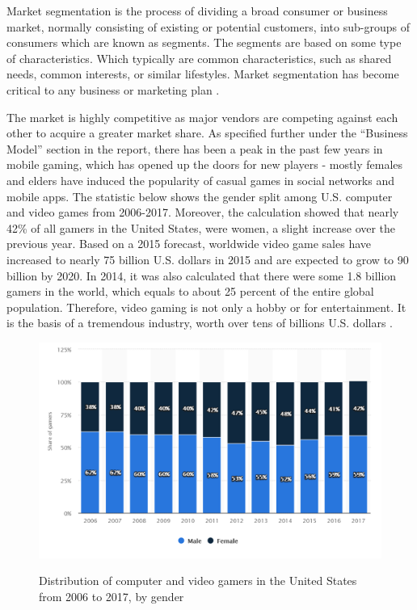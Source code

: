 \documentclass[12p]{article}
\begin{document}
Market segmentation is the process of dividing a broad consumer or business market, normally consisting of existing or potential customers, into sub-groups of consumers which are known as segments. The segments are based on some type of characteristics. Which typically are common characteristics, such as shared needs, common interests, or similar lifestyles. Market segmentation has become critical to any business or marketing plan \cite{MarketSegmentation}.

The market is highly competitive as major vendors are competing against each other to acquire a greater market share.  As specified further under the “Business Model” section in the report, there has been a peak in the past few years in mobile gaming, which has opened up the doors for new players - mostly females and elders have induced the popularity of casual games in social networks and mobile apps. The statistic below shows the gender split among U.S. computer and video games from 2006-2017. Moreover, the calculation showed that nearly 42\% of all gamers in the United States, were women, a slight increase over the previous year. Based on a 2015 forecast, worldwide video game sales have increased to nearly 75 billion U.S. dollars in 2015 and are expected to grow to 90 billion by 2020. In 2014, it was also calculated that there were some 1.8 billion gamers in the world, which equals to about 25 percent of the entire global population. Therefore, video gaming is not only a hobby or for entertainment. It is the basis of a tremendous industry, worth over tens of billions U.S. dollars \cite{VideoGamerGender}.

\begin{figure}[ht]
  \center
  \includegraphics[width=1\textwidth]{BusinessStrategy/Statistics-MarketSeg}
  \label{Statistcs-MarketSeg}
  \caption{Distribution of computer and video gamers in the United States from 2006 to 2017, by gender \cite{NezooScreenshot}}
\end{figure}
\end{document}
